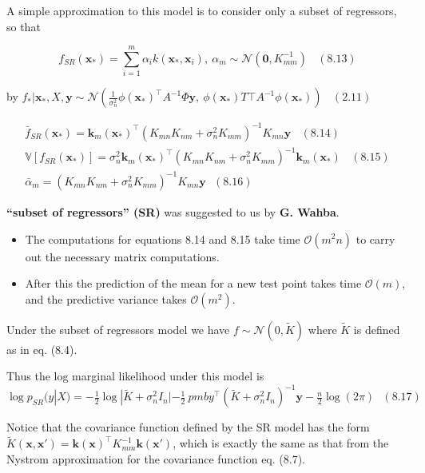 \documentclass[
  ignorenonframetext,
]{beamer}
\begin{document}
\begin{frame}{}
\protect\hypertarget{section-9}{}
A simple approximation to this model is to consider only a subset of
regressors, so that

\[
f_{SR}(\pmb x_*) = \sum^m_{i=1} \alpha_ik(\pmb x_* , \pmb x_i),\  \alpha_m \sim \mathcal N(\pmb 0, K_{mm}^{−1}) \ \ \ \ (8.13)
\]

by
\(f_*|\pmb x_*, X, \pmb y \sim \mathcal N (\frac {1}{\sigma^2_n} \phi(\pmb x_*)^{\top}A^{-1}\Phi\pmb y,\ \phi(\pmb x_*)T{\top}A^{-1}\phi(\pmb x_*)) \ \ \ \ (2.11)\)

\[
\begin{split}
\bar f_{SR} (\pmb x_*) = \pmb k_m(\pmb x_*)^{\top} (K_{mn}K_{nm} +  \sigma_n^2K_{mm})^{-1}K_{mn} \pmb y \ \ \ \ (8.14)\\
\mathbb V[f_{SR}(\pmb x_*)] =  \sigma_n^2 \pmb k_m(\pmb x_*)^{\top}(K_{mn}K_{nm} +  \sigma_n^2K_{mm})^{-1}\pmb k_m(\pmb x_*) \ \ \ \ (8.15)\\
\bar \alpha_m = (K_{mn}K_{nm} +  \sigma_n^2K_{mm})^{-1}K_{mn} \pmb y \ \ \ (8.16)
\end{split}
\]
\end{frame}

\begin{frame}{\textbf{``subset of regressors'' (SR)} was suggested to us
by \textbf{G. Wahba}.}
\protect\hypertarget{subset-of-regressors-sr-was-suggested-to-us-by-g.-wahba.}{}
\begin{itemize}
\item
  The computations for equations 8.14 and 8.15 take time
  \(\mathcal O(m^2n)\) to carry out the necessary matrix computations.
\item
  After this the prediction of the mean for a new test point takes time
  \(\mathcal O(m)\), and the predictive variance takes
  \(\mathcal O(m^2)\).
\end{itemize}

Under the subset of regressors model we have
\(f \sim \mathcal N(0, {\tilde K})\) where \({\tilde K}\) is defined as
in eq. (8.4).

Thus the log marginal likelihood under this model is
\(\log p_{SR}(y|X) = -{\frac 1 2} \log | {\tilde K} + \sigma_n^2 I_n| - {\frac 1 2}\ pmb y^{\top} ({\tilde K} + \sigma_n^2 I_n)^{-1} \pmb y - {\frac n 2} \log(2\pi) \ \ \  (8.17)\)

Notice that the covariance function defined by the SR model has the form
\({\tilde K}(\pmb x, \pmb x') = \pmb k(\pmb x)^{\top} K_{mm}^{-1} \pmb k(\pmb x')\),
which is exactly the same as that from the Nystrom approximation for the
covariance function eq. (8.7).
\end{frame}
\end{document}
